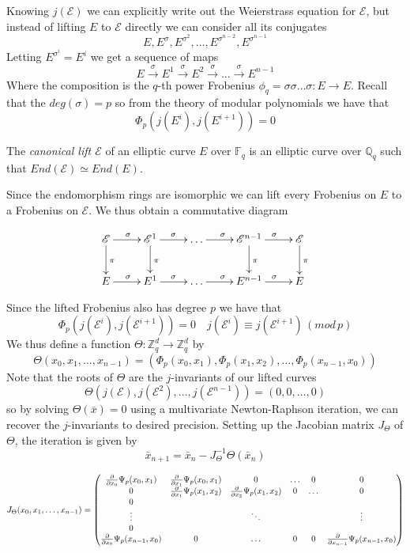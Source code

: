 \documentclass[a4paper,10pt]{amsart}
\begin{document}
Knowing $j(\mathscr{E})$ we can explicitly write out the Weierstrass equation for $\mathscr{E}$, but
instead of lifting $E$ to $\mathscr{E}$ directly we can consider all its conjugates
$$E, E^\sigma, E^{\sigma^2}, \ldots, E^{\sigma^{n-2}}, E^{\sigma^{n-1}} $$
Letting $E^{\sigma^i} = E^i $ we get a sequence of maps
$$ E \overset{\sigma}{\rightarrow} E^1 \overset{\sigma}{\rightarrow} E^2 \overset{\sigma}{\rightarrow}
\ldots \overset{\sigma}{\rightarrow} E^{n-1} $$
Where the composition is the $q$-th power Frobenius $\phi_q = \sigma \sigma \ldots \sigma: E \rightarrow E$.
Recall that the $deg(\sigma) = p$ so from the theory of modular polynomials we have that
$$ \Phi_p(j(E^i), j(E^{i+1})) = 0 $$

\begin{mydef}
 The \emph{canonical lift $\mathscr{E}$} of an elliptic curve $E$ over $\mathbb{F}_q$ is
an elliptic curve over $\mathbb{Q}_q$ such that $End(\mathscr{E}) \simeq End(E)$.
\end{mydef}

Since the endomorphism rings are isomorphic we can lift every Frobenius on $E$ to a
Frobenius on $\mathscr{E}$. We thus obtain a commutative diagram

$$
\xymatrix {
  \mathscr{E} \ar[d]^\pi \ar[r]^\sigma & \mathscr{E}^1 \ar[d]^\pi \ar[r]^\sigma & \ldots \ar[r]^\sigma & \mathscr{E}^{n-1} \ar[d]^\pi \ar[r]^\sigma & \mathscr{E} \ar[d]^\pi \\
  E \ar[r]^\sigma & E^1 \ar[r]^\sigma &\ldots \ar[r]^\sigma & E^{n-1} \ar[r]^\sigma & E \\
}
$$

Since the lifted Frobenius also has degree $p$ we have that
$$\Phi_p(j(\mathscr{E}^i), j(\mathscr{E}^{i+1})) = 0 \quad j(\mathscr{E}^i) \equiv j(\mathscr{E}^{i+1}) \, (mod\, p) $$
We thus define a function $\Theta: \mathbb{Z}_q^d \rightarrow \mathbb{Z}_q^d$ by
$$\Theta(x_0, x_1, \ldots, x_{n-1}) = (\Phi_p(x_0, x_1), \Phi_p(x_1, x_2), \ldots, \Phi_p(x_{n-1}, x_0))$$
Note that the roots of $\Theta$ are the $j$-invariants of our lifted curves
$$\Theta(j(\mathscr{E}), j(\mathscr{E}^2), \ldots, j(\mathscr{E}^{n-1})) = (0, 0, \ldots, 0) $$
so by solving $\Theta(\bar{x}) = 0$ using a multivariate Newton-Raphson iteration, we can
recover the $j$-invariants to desired precision. Setting up the Jacobian matrix $J_\Theta$
of $\Theta$, the iteration is given by
$$ \bar{x}_{n+1} = \bar{x}_n - J_\Theta^{-1} \Theta(\bar{x}_n) $$

$$
J_\Theta(x_0, x_1, \ldots, x_{n-1}) = 
\begin{pmatrix}
  {\partial \over \partial x_0} \Psi_p(x_0, x_1) & {\partial \over \partial x_1} \Psi_p(x_0, x_1) & 0 & \ldots & 0 & 0 \\
  0 & {\partial \over \partial x_1} \Psi_p(x_1, x_2) & {\partial \over \partial x_2} \Psi_p(x_1, x_2) & 0 & \ldots & 0 \\
  0 \\
  \vdots & & \ddots & & & \vdots \\
  0 \\
  {\partial \over \partial x_0} \Psi_p(x_{n-1}, x_0) & 0 & \ldots & 0 & 0 & {\partial \over \partial x_{n-1}} \Psi_p(x_{n-1}, x_0) \\
\end{pmatrix}
$$
\end{document}
